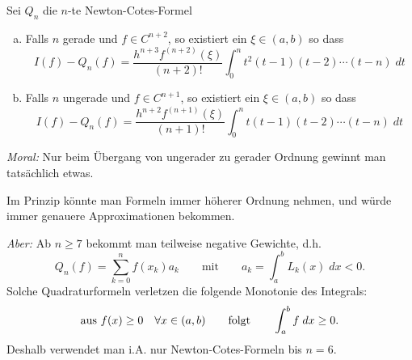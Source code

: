 \begin{satz}
Sei $Q_n$ die $n$-te Newton-Cotes-Formel
\begin{enumerate}[a)]
\item Falls $n$ gerade und $f \in C^{n+2}$, so existiert ein $\xi \in (a,b)$ so dass
\begin{equation*}
I(f) - Q_n(f) = \frac{h^{n+3}f^{(n+2)}(\xi)}{(n+2)!} \int_0^n t^2(t-1) (t-2) \cdots (t-n) \; dt
\end{equation*}
\item Falls $n$ ungerade und $f \in C^{n+1}$, so existiert ein $\xi \in (a,b)$ so dass
\begin{equation*}
I(f) - Q_n(f) = \frac{h^{n+2}f^{(n+1)}(\xi)}{(n+1)!} \int_0^n t(t-1) (t-2) \cdots (t-n) \; dt
\end{equation*}
\end{enumerate}
\end{satz}
\emph{Moral:} Nur beim Übergang von ungerader zu gerader Ordnung gewinnt man tatsächlich etwas.

\bigskip

Im Prinzip könnte man Formeln immer höherer Ordnung nehmen, und würde immer genauere Approximationen bekommen.

\medskip

\emph{Aber:} Ab $n \ge 7$ bekommt man teilweise negative Gewichte, d.h.
\begin{equation*}
Q_n(f) = \sum_{k=0}^n f(x_k) a_k
\qquad \text{mit} \qquad
a_k = \int_a^b L_k(x) \; dx < 0.
\end{equation*}
Solche Quadraturformeln verletzen die folgende Monotonie des Integrals:
\begin{equation*}
\textnormal{aus } f(x) \ge 0 \quad \forall x \in (a,b)
\qquad \text{folgt} \qquad
\int_a^b f \; dx \ge 0 .
\end{equation*}
Deshalb verwendet man i.A. nur Newton-Cotes-Formeln bis $n=6$.

